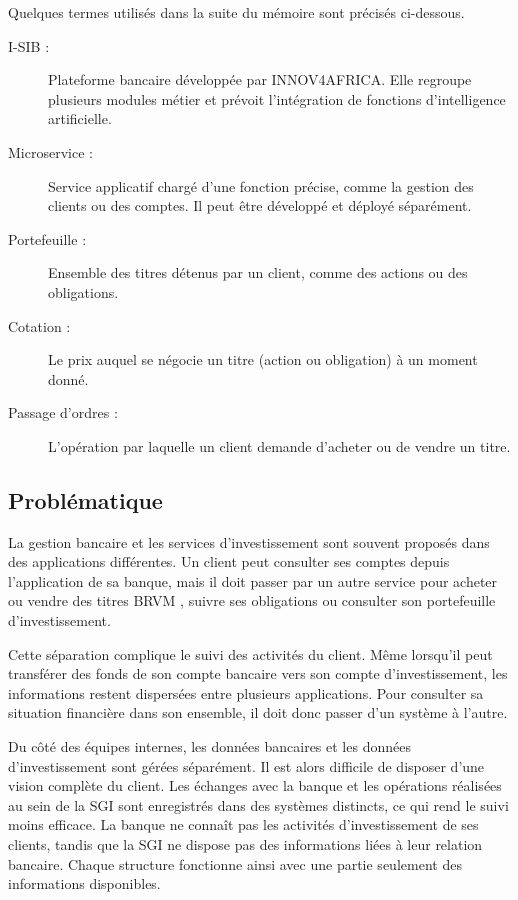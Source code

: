 Quelques termes utilisés dans la suite du mémoire sont précisés ci-dessous.

\begin{description}
    \item[I-SIB :] Plateforme bancaire développée par INNOV4AFRICA. Elle regroupe
    plusieurs modules métier et prévoit l'intégration de fonctions
    d'intelligence artificielle.
    \item[Microservice :] Service applicatif chargé d'une fonction précise, comme
    la gestion des clients ou des comptes. Il peut être développé et déployé
    séparément.
    \item[Portefeuille :] Ensemble des titres détenus par un client, comme des
    actions ou des obligations.
    \item[Cotation :] Le prix auquel se négocie un titre (action ou obligation)
    à un moment donné.
    \item[Passage d'ordres :] L'opération par laquelle un client demande
    d'acheter ou de vendre un titre.
\end{description}




\subsection{Problématique}

La gestion bancaire et les services d'investissement sont souvent proposés
dans des applications différentes. Un client peut consulter ses comptes depuis
l'application de sa banque, mais il doit passer par un autre service pour
acheter ou vendre des titres BRVM \cite{brvm_actions}, suivre ses obligations
ou consulter son portefeuille d'investissement.


Cette séparation complique le suivi des activités du client. Même lorsqu'il peut transférer des fonds de son compte bancaire vers son compte d'investissement, les informations restent dispersées entre plusieurs applications. Pour consulter sa situation financière dans son ensemble, il doit donc passer d'un système à l'autre.

Du côté des équipes internes, les données bancaires et les données d'investissement sont gérées séparément. Il est alors difficile de disposer d'une vision complète du client. Les échanges avec la banque et les opérations réalisées au sein de la SGI sont enregistrés dans des systèmes distincts, ce qui rend le suivi moins efficace. La banque ne connaît pas les activités d'investissement de ses clients, tandis que la SGI ne dispose pas des informations liées à leur relation bancaire. Chaque structure fonctionne ainsi avec une partie seulement des informations disponibles.

